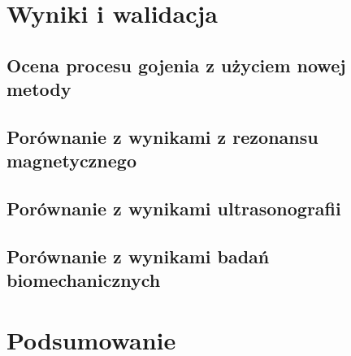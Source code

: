 \chapter{Wyniki i walidacja}
\section{Ocena procesu gojenia z użyciem nowej metody}
\section{Porównanie z wynikami z rezonansu magnetycznego}
\section{Porównanie z wynikami ultrasonografii}
\section{Porównanie z wynikami badań biomechanicznych}
\chapter{Podsumowanie}